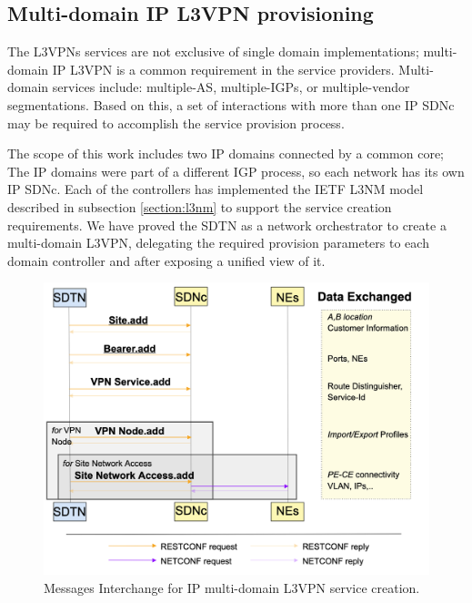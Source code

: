 \documentclass[10pt, conference]{IEEEtran}
\begin{document}
\subsection{Multi-domain IP L3VPN provisioning}
\label{section:muli-l3nm}

The L3VPNs services are not exclusive of single domain implementations; multi-domain IP L3VPN is a common requirement in the service providers. Multi-domain services include: multiple-AS, multiple-IGPs, or multiple-vendor segmentations. Based on this, a set of interactions with more than one IP SDNc may be required to accomplish the service provision process.

The scope of this work includes two IP domains connected by a common core; The IP domains were part of a different IGP process, so each network has its own IP SDNc. Each of the controllers has implemented the IETF L3NM model described in subsection \ref{section:l3nm} to support the service creation requirements. We have proved the SDTN  as a network orchestrator to create a multi-domain L3VPN, delegating the required provision parameters to each domain controller and after exposing a unified view of it.

\begin{figure}
	\centering
		\includegraphics[width=\linewidth]{figs/diagram-9.png}
	\caption{Messages Interchange for IP multi-domain L3VPN service creation.}
	\label{FIG:l3vpn_workflow}
\end{figure}
\end{document}
